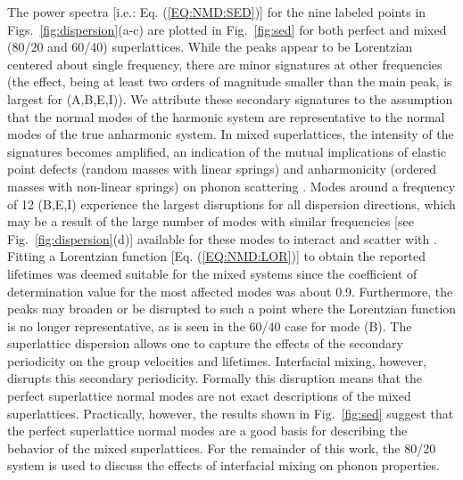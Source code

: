 The power spectra [i.e.: Eq. (\ref{EQ:NMD:SED})] for the nine labeled points in Figs.~\ref{fig:dispersion}(a-c) are plotted in Fig.~\ref{fig:sed} for both perfect and mixed (80/20 and 60/40) superlattices. While the peaks appear to be Lorentzian centered about single frequency, there are minor signatures at other frequencies (the effect, being at least two orders of magnitude smaller than the main peak, is largest for (A,B,E,I)). We attribute these secondary signatures to the assumption that the normal modes of the harmonic system are representative to the normal modes of the true anharmonic system. In mixed superlattices, the intensity of the signatures becomes amplified, an indication of the mutual implications of elastic point defects (random masses with linear springs) and anharmonicity (ordered masses with non-linear springs) on phonon scattering \cite{RevModPhys.53.175}. Modes around a frequency of 12 (B,E,I) experience the largest disruptions for all dispersion directions, which may be a result of the large number of modes with similar frequencies [see Fig.~\ref{fig:dispersion}(d)] available for these modes to interact and scatter with \cite{tamura_isotope_1983}. Fitting a Lorentzian function [Eq. (\ref{EQ:NMD:LOR})] to obtain the reported lifetimes was deemed suitable for the mixed systems since the coefficient of determination value \cite{Cowpe20081066} for the most affected modes was about 0.9. Furthermore, the peaks may broaden or be disrupted to such a point where the Lorentzian function is no longer representative, as is seen in the 60/40 case for mode (B). %
The superlattice dispersion allows one to capture the effects of the secondary periodicity on the group velocities and lifetimes. Interfacial mixing, however, disrupts this secondary periodicity. Formally this disruption means that the perfect superlattice normal modes are not exact descriptions of the mixed superlattices. Practically, however, the results shown in Fig.~\ref{fig:sed} suggest that the perfect superlattice normal modes are a good basis for describing the behavior of the mixed superlattices. %
For the remainder of this work, the 80/20 system is used to discuss the effects of interfacial mixing on phonon properties.
\renewcommand{\topfraction}{1.0}
\begin{figure*}%
\begin{center}
\renewcommand{\figure}{Fig.}
\caption{Power spectra for selected modes of the $4\times 4$ [indicated by the labeled gray square markers in Figs.~\ref{fig:dispersion}(a-c)]. Dark blue corresponds to a superlattice without mixing, red corresponds to mixing of 80/20 and light blue corresponds to mixing of 60/40. Reported lifetimes calculated from the fitting of the Lorentzian functions (not shown) are identified by the subscripts.}
\label{fig:sed}
\end{center}
\end{figure*}

